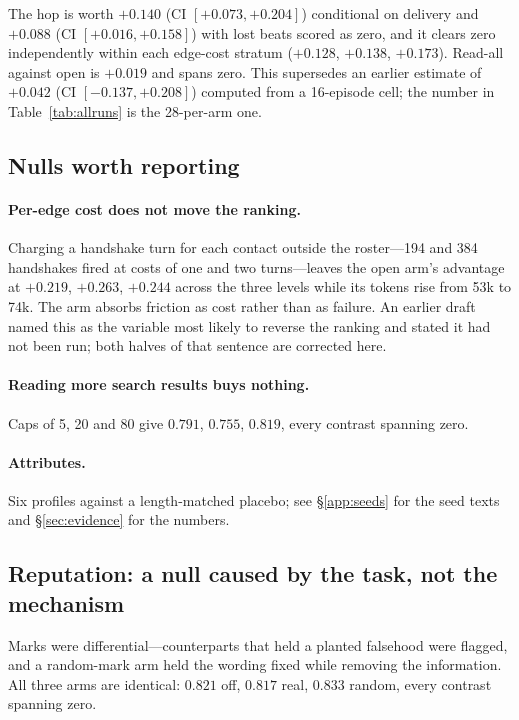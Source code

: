 The hop is worth $+0.140$ (CI $[+0.073, +0.204]$) conditional on delivery and $+0.088$
(CI $[+0.016, +0.158]$) with lost beats scored as zero, and it clears zero independently
within each edge-cost stratum ($+0.128$, $+0.138$, $+0.173$). Read-all against open is
$+0.019$ and spans zero. This supersedes an earlier estimate of $+0.042$ (CI
$[-0.137, +0.208]$) computed from a 16-episode cell; the number in Table~\ref{tab:allruns}
is the 28-per-arm one.

\subsection{Nulls worth reporting}

\paragraph{Per-edge cost does not move the ranking.} Charging a handshake turn for each
contact outside the roster---194 and 384 handshakes fired at costs of one and two
turns---leaves the open arm's advantage at $+0.219$, $+0.263$, $+0.244$ across the three
levels while its tokens rise from 53k to 74k. The arm absorbs friction as cost rather
than as failure. An earlier draft named this as the variable most likely to reverse the
ranking and stated it had not been run; both halves of that sentence are corrected here.

\paragraph{Reading more search results buys nothing.} Caps of 5, 20 and 80 give
$0.791$, $0.755$, $0.819$, every contrast spanning zero.

\paragraph{Attributes.} Six profiles against a length-matched placebo; see
\S\ref{app:seeds} for the seed texts and \S\ref{sec:evidence} for the numbers.

\subsection{Reputation: a null caused by the task, not the mechanism}
\label{app:reputation}

Marks were differential---counterparts that held a planted falsehood were flagged, and a
random-mark arm held the wording fixed while removing the information. All three arms are
identical: $0.821$ off, $0.817$ real, $0.833$ random, every contrast spanning zero.

